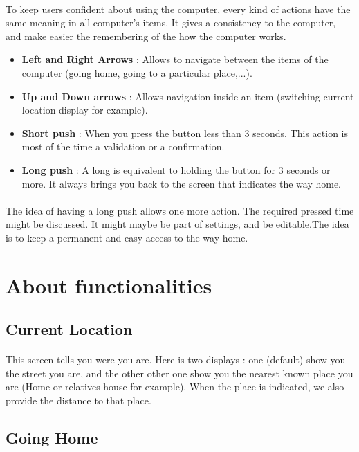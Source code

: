 \documentclass[a4paper,11pt]{article} %
\begin{document}
\paragraph{}To keep users confident about using the computer, every kind of actions have the same meaning in all computer's items. It gives a consistency to the computer, and make easier the remembering of the how the computer works.
\begin{itemize}
\item \textbf{Left and Right Arrows} :  Allows to navigate between the items of the computer (going home, going to a particular place,...). 
\item \textbf{Up and Down arrows} : Allows navigation inside an item (switching current location display for example).
\item \textbf{Short push} : When you press the button less than 3 seconds. This action is most of the time a validation or a confirmation.
\item \textbf{Long push}  : A long is equivalent to holding the button for 3 seconds or more. It always brings you back to the screen that indicates the way home.
\end{itemize}
\paragraph{}The idea of having a long push allows one more action. The required pressed time might be discussed. It might maybe be part of settings, and be editable.The idea is to keep a permanent and easy access to the way home. 

\section{About functionalities}
\subsection{Current Location}
\paragraph{}This screen tells you were you are. Here is two displays : one (default) show you the street you are, and the other other one show you the nearest known place you are (Home or relatives house for example). When the place is indicated, we also provide the distance to that place.
\subsection{Going Home}
\end{document}
